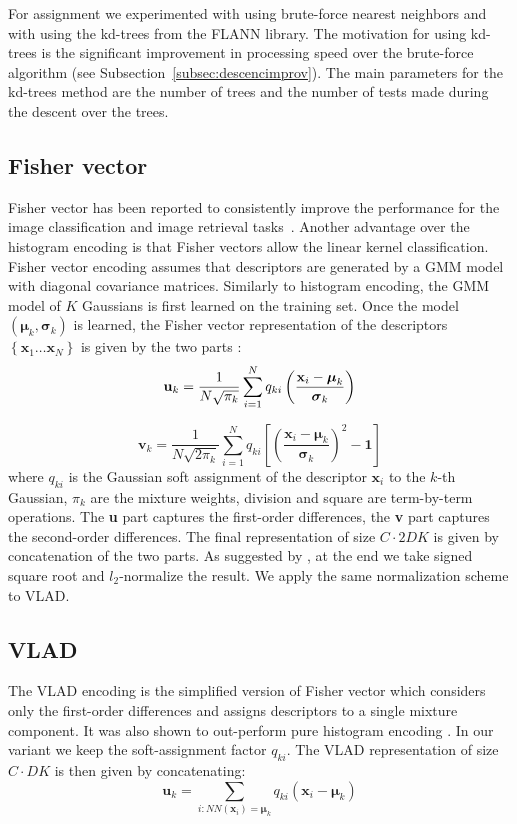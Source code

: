 \documentclass[10pt,twocolumn,letterpaper]{article}
\begin{document}
For assignment we experimented with using brute-force nearest neighbors and with using the kd-trees from the FLANN library. The motivation for using kd-trees is the significant improvement in processing speed over the brute-force algorithm (see Subsection~\ref{subsec:descencimprov}). The main parameters for the kd-trees method are the number of trees and the number of tests  made during the descent over the trees. 

\subsection{Fisher vector}
Fisher vector has been reported to consistently improve the performance for the image classification and image retrieval tasks~\cite{Jegou12}. Another advantage over the histogram encoding is that Fisher vectors allow the linear kernel classification. Fisher vector encoding assumes that descriptors are generated by a GMM model with diagonal covariance matrices. Similarly to histogram encoding, the GMM model of $K$ Gaussians is first learned on the training set. 
Once the model $\left(\boldsymbol\mu_k, \boldsymbol\sigma_k\right)$ is learned, the Fisher vector representation of the descriptors $\left\{\textbf{x}_1\dots \textbf{x}_N\right\}$ is given by the two parts \cite{Perronnin10}:
$${\textbf u}_k = \frac{1}{N\sqrt{\pi_k}}\sum_{i=1}^{N}q_{ki}\left(\frac{\textbf{x}_i-\boldsymbol\mu_k}{\boldsymbol\sigma_k}\right)$$

\begin{equation}
\label{eq:fv_vk}
\textbf{v}_k=\frac{1}{N\sqrt{2\pi_k}}\sum_{i=1}^{N}q_{ki}\left[\left(\frac{\textbf{x}_i-\boldsymbol\mu_k}{\boldsymbol\sigma_k}\right)^2-\textbf{1}\right]
\end{equation}
where $q_{ki}$ is the Gaussian soft assignment of the descriptor $\textbf{x}_i$ to the $k$-th Gaussian, $\pi_k$ are the mixture weights, division and square are term-by-term operations. The \textbf{u} part captures the first-order differences, the \textbf{v} part captures the second-order differences. The final representation of size $C\cdot 2DK$ is given by concatenation of the two parts. As suggested by \cite{Perronnin10}, at the end we take signed square root and $l_2$-normalize the result. We apply the same normalization scheme to VLAD.
\subsection{VLAD}
The VLAD encoding is the simplified version of Fisher vector which considers only the first-order differences and assigns descriptors to a single mixture component. It was also shown to out-perform pure histogram encoding \cite{Jegou12}. In our variant we keep the soft-assignment factor $q_{ki}$. The VLAD representation of size $C\cdot DK$ is then given by concatenating:$$\textbf{u}_k=\sum_{i : NN\left(\textbf{x}_i\right)=\boldsymbol\mu_k}q_{ki}\left(\textbf{x}_i -\boldsymbol\mu_k\right)$$
\end{document}
